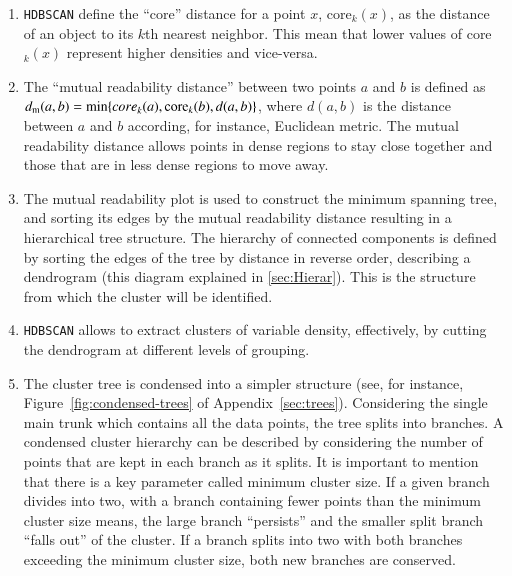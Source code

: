 \documentclass[fleqn,usenatbib]{mnras}
\newcommand{\comment}[1]{\textcolor{red}{#1}}
\begin{document}
\begin{enumerate}
\item \texttt{HDBSCAN} define the ``core'' distance for a point $x$, core$_k(x)$,
  as the distance of an object to its $k$th nearest neighbor. This mean that lower values of core$_k(x)$ 
  represent higher densities and vice-versa.

\item The ``mutual readability distance'' between two points $a$ and $b$ is defined as
  $d_{\mathrm{m}}(a, b) = \mathrm{min}{\mathrm\{core}_k(a), \mathrm{core}_k(b), d(a, b)\}$,
  where $d(a, b)$ is the distance between $a$ and $b$ according, for instance,
  Euclidean metric. The mutual readability distance allows points in dense regions
  to stay close together and those that are in less dense regions to move away.%

\item The mutual readability plot is used to construct the minimum spanning tree,
  and sorting its edges by the mutual readability distance resulting in a
  hierarchical tree structure. The hierarchy of connected components is
  defined by sorting the edges of the tree by distance in reverse order,
  describing a dendrogram (this diagram explained in \ref{sec:Hierar}). 
  This is the structure from which the cluster will be identified.

\item \texttt{HDBSCAN} allows to extract clusters of variable density, effectively,
  by cutting the dendrogram at different levels of grouping. 

\item The cluster tree is condensed into a simpler structure (see, for instance, 
Figure~\ref{fig:condensed-trees} of Appendix~\ref{sec:trees}). 
Considering the single main trunk which contains all the data points, the tree splits 
into branches. A condensed cluster hierarchy can be described by considering the 
number of points
  that are kept in each branch as it splits. It is important to mention that there 
  is a key parameter called minimum
cluster size. If a given branch divides into two, with a branch
  containing fewer points than the minimum cluster size means, the large branch
  ``persists'' and the smaller split branch ``falls out'' of the  cluster. If
  a branch splits into two with both branches exceeding the minimum cluster size,
  both new branches are conserved.


\end{enumerate}
\end{document}
